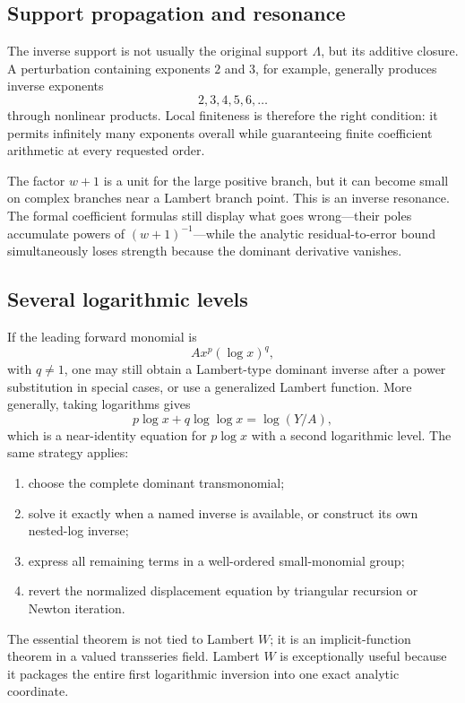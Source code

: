 \documentclass[11pt]{article}
\theoremstyle{definition}
\theoremstyle{remark}
\begin{document}
\subsection{Support propagation and resonance}

The inverse support is not usually the original support \(\Lambda\), but its additive closure.  A perturbation containing exponents \(2\) and \(3\), for example, generally produces inverse exponents
\[
 2,3,4,5,6,\ldots
\]
through nonlinear products.  Local finiteness is therefore the right condition: it permits infinitely many exponents overall while guaranteeing finite coefficient arithmetic at every requested order.

The factor \(w+1\) is a unit for the large positive branch, but it can become small on complex branches near a Lambert branch point.  This is an inverse resonance.  The formal coefficient formulas still display what goes wrong---their poles accumulate powers of \((w+1)^{-1}\)---while the analytic residual-to-error bound simultaneously loses strength because the dominant derivative vanishes.

\subsection{Several logarithmic levels}

If the leading forward monomial is
\[
 A x^p(\log x)^q,
\]
with \(q\ne1\), one may still obtain a Lambert-type dominant inverse after a power substitution in special cases, or use a generalized Lambert function.  More generally, taking logarithms gives
\[
 p\log x+q\log\log x=\log(Y/A),
\]
which is a near-identity equation for \(p\log x\) with a second logarithmic level.  The same strategy applies:

\begin{enumerate}
\item choose the complete dominant transmonomial;
\item solve it exactly when a named inverse is available, or construct its own nested-log inverse;
\item express all remaining terms in a well-ordered small-monomial group;
\item revert the normalized displacement equation by triangular recursion or Newton iteration.
\end{enumerate}

The essential theorem is not tied to Lambert \(W\); it is an implicit-function theorem in a valued transseries field.  Lambert \(W\) is exceptionally useful because it packages the entire first logarithmic inversion into one exact analytic coordinate.
\end{document}
